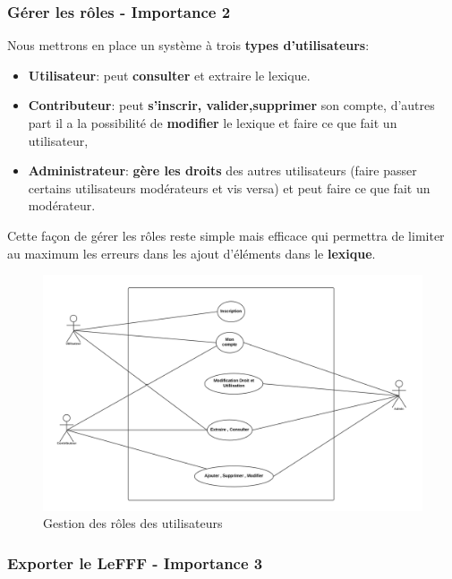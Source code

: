 \subsubsection{Gérer les rôles - Importance 2}
    
    Nous mettrons en place un système à trois \textbf{types d'utilisateurs}:
    \begin{itemize}
    \item \textbf{Utilisateur}:  peut \textbf{consulter} et extraire le lexique.
    \item \textbf{Contributeur}: peut \textbf{s'inscrir, valider,supprimer} son compte, d'autres part il a la possibilité de \textbf{modifier} le lexique et faire ce que fait un utilisateur,
    \item \textbf{Administrateur}: \textbf{gère les droits} des autres utilisateurs (faire passer certains utilisateurs modérateurs et vis versa) et peut faire ce que fait un modérateur.
    \end{itemize}
    {Cette façon de gérer les rôles reste simple mais efficace qui permettra de limiter au maximum les erreurs dans les ajout d'éléments dans le \textbf{lexique}.\par}
    
    \begin{figure}[ht]
        \centering
        \includegraphics[scale=0.3]{uml.png}
        \caption{Gestion des rôles des utilisateurs }
    \end{figure}
    \newpage
    

 
\subsubsection{Exporter le LeFFF - Importance 3}

